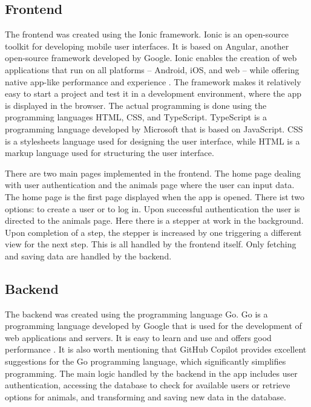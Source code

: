 \documentclass{josis}
\begin{document}
\subsection{Frontend}

The frontend was created using the Ionic framework. Ionic is an open-source toolkit for 
developing mobile user interfaces. It is based on Angular, another open-source framework developed by Google. 
Ionic enables the creation of web applications that run on all platforms -- Android, iOS, and web -- while 
offering native app-like performance and experience \cite{IonicFrameworkCrossPlatform}.
The framework makes it relatively easy to start a project and test it in a development environment, 
where the app is displayed in the browser. The actual programming is done using the programming 
languages HTML, CSS, and TypeScript. TypeScript is a programming language developed by Microsoft that is based on JavaScript. 
CSS is a stylesheets language used for designing the user interface, while HTML is a markup language used for structuring the user interface.

There are two main pages implemented in the frontend. The home page dealing with user authentication and 
the animals page where the user can input data. The home page is the first page displayed when the app is opened.
There ist two options: to create a user or to log in. Upon successful authentication the user is directed to the
animals page. Here there is a stepper at work in the background. Upon completion of a step, the stepper is increased
by one triggering a different view for the next step. This is all handled by the frontend itself. Only fetching and saving
data are handled by the backend.

\subsection{Backend}

The backend was created using the programming language Go. Go is a programming language developed 
by Google that is used for the development of web applications and servers. 
It is easy to learn and use and offers good performance \cite{GoProgrammingLanguage}.
It is also worth mentioning that GitHub Copilot provides excellent suggestions for 
the Go programming language, which significantly simplifies programming. The main logic handled 
by the backend in the app includes user authentication, accessing the database to check for available 
users or retrieve options for animals, and transforming and saving new data in the database.
\end{document}
